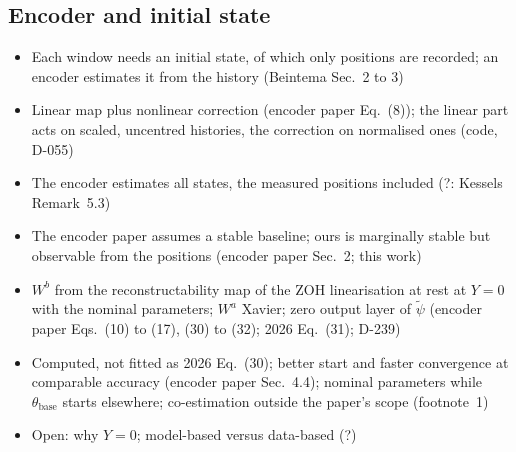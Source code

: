 \subsection{Encoder and initial state}\label{sec:aug_encoder}
\ifdraft
\begin{itemize}
\item Each window needs an initial state, of which only positions are recorded; an encoder estimates it from the history (Beintema Sec.~2 to 3)
\item Linear map plus nonlinear correction (encoder paper Eq.~(8)); the linear part acts on scaled, uncentred histories, the correction on normalised ones (code, D-055)
\item The encoder estimates all states, the measured positions included (?: Kessels Remark~5.3)
\item The encoder paper assumes a stable baseline; ours is marginally stable but observable from the positions (encoder paper Sec.~2; this work)
\item $W^b$ from the reconstructability map of the ZOH linearisation at rest at $Y=0$ with the nominal parameters; $W^a$ Xavier; zero output layer of $\tilde\psi$ (encoder paper Eqs.~(10) to (17), (30) to (32); 2026 Eq.~(31); D-239)
\item Computed, not fitted as 2026 Eq.~(30); better start and faster convergence at comparable accuracy (encoder paper Sec.~4.4); nominal parameters while $\theta_{\mathrm{base}}$ starts elsewhere; co-estimation outside the paper's scope (footnote~1)
\item Open: why $Y=0$; model-based versus data-based (?)
\end{itemize}
\fi

